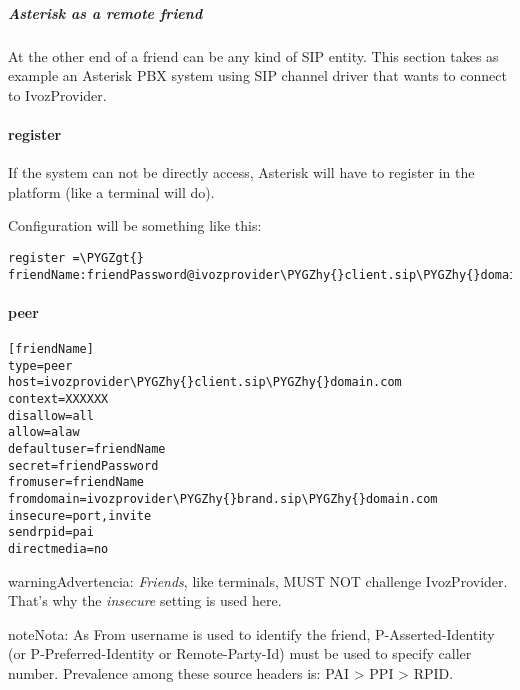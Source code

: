 \documentclass[letterpaper,10pt,spanish]{sphinxmanual}
\def\PYGZgt{\char`\>}
\def\PYGZhy{\char`\-}
\begin{document}
\subparagraph{Asterisk as a remote friend}
\label{administration_portal/client/vpbx/routing_endpoints/friends/remote_friends:asterisk-as-a-remote-friend}
At the other end of a friend can be any kind of SIP entity. This section takes
as example an Asterisk PBX system using SIP channel driver that wants to connect
to IvozProvider.
\paragraph{register}

If the system can not be directly access, Asterisk will have to register in the
platform (like a terminal will do).

Configuration will be something like this:

\begin{Verbatim}[commandchars=\\\{\}]
register =\PYGZgt{} friendName:friendPassword@ivozprovider\PYGZhy{}client.sip\PYGZhy{}domain.com
\end{Verbatim}
\paragraph{peer}

\begin{Verbatim}[commandchars=\\\{\}]
[friendName]
type=peer
host=ivozprovider\PYGZhy{}client.sip\PYGZhy{}domain.com
context=XXXXXX
disallow=all
allow=alaw
defaultuser=friendName
secret=friendPassword
fromuser=friendName
fromdomain=ivozprovider\PYGZhy{}brand.sip\PYGZhy{}domain.com
insecure=port,invite
sendrpid=pai
directmedia=no
\end{Verbatim}

\begin{notice}{warning}{Advertencia:}
\emph{Friends}, like terminals, MUST NOT challenge IvozProvider. That's
why the \emph{insecure} setting is used here.
\end{notice}

\begin{notice}{note}{Nota:}
As From username is used to identify the friend, P-Asserted-Identity (or P-Preferred-Identity or Remote-Party-Id) must be used to specify caller number.
Prevalence among these source headers is: PAI \textgreater{} PPI \textgreater{} RPID.
\end{notice}
\end{document}
